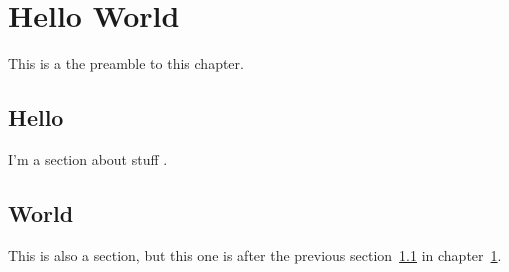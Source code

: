 \chapter{Hello World}\label{sec:hello-world}

This is a the preamble to this chapter.

\section{Hello}\label{sec:hello}

I'm a section about stuff \cite{dummy:1}.

\section{World}

This is also a section, but this one is after the previous section~\ref{sec:hello} in chapter~\ref{sec:hello-world}.